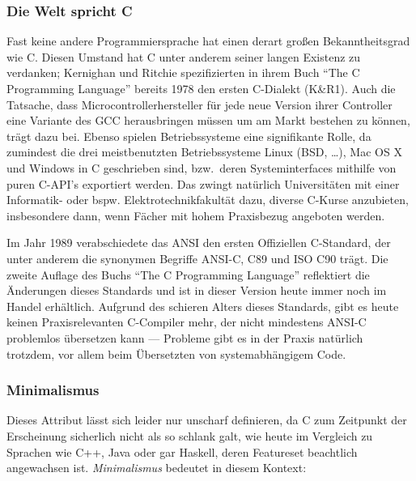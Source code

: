 \documentclass[oneside,a4paper]{article}
\begin{document}
\subsubsection{Die Welt spricht C}
Fast keine andere
Programmiersprache hat einen derart großen Bekanntheitsgrad wie C. Diesen Umstand
hat C unter anderem seiner langen Existenz zu verdanken; Kernighan und Ritchie
spezifizierten in ihrem Buch ``The C Programming Language'' bereits 1978 den
ersten C-Dialekt (K\&R1). Auch die Tatsache, dass Microcontrollerhersteller
für jede neue Version ihrer Controller eine Variante des GCC herausbringen
müssen um am Markt bestehen zu können, trägt dazu bei.  %
Ebenso spielen
Betriebssysteme eine signifikante Rolle, da zumindest die drei meistbenutzten Betriebssysteme %
Linux (BSD, \ldots), Mac OS X und Windows in C geschrieben sind, bzw.\ deren
Systeminterfaces mithilfe von puren C-API's exportiert werden.
Das zwingt natürlich Universitäten mit einer
Informatik- oder bspw. Elektrotechnikfakultät dazu, diverse C-Kurse anzubieten,
insbesondere dann, wenn Fächer mit hohem Praxisbezug angeboten werden.

Im Jahr 1989 verabschiedete das ANSI den ersten Offiziellen C-Standard, der
unter anderem die synonymen Begriffe ANSI-C, C89 und ISO C90 trägt.
Die zweite Auflage des Buchs ``The C Programming Language'' reflektiert die
Änderungen dieses Standards und ist in dieser Version heute immer noch im
Handel erhältlich. Aufgrund des schieren Alters dieses Standards, gibt es heute
keinen Praxisrelevanten C-Compiler mehr, der nicht mindestens ANSI-C problemlos
übersetzen kann --- Probleme gibt es in der Praxis natürlich trotzdem, vor allem
beim Übersetzten von systemabhängigem Code.

\subsubsection{Minimalismus}
Dieses Attribut lässt sich
leider nur unscharf definieren, da C zum Zeitpunkt der Erscheinung sicherlich
nicht als so schlank galt, wie heute im Vergleich zu Sprachen wie C++,
Java oder gar Haskell, deren
Featureset beachtlich angewachsen ist. \emph{Minimalismus} bedeutet in
diesem Kontext:
\end{document}
